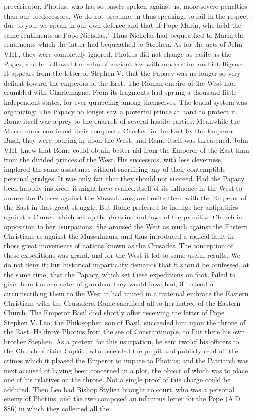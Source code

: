 prevaricator, Photius, who has so basely spoken against us, more severe penalties than our predecessors. We do not presume, in thus speaking, to fail in the respect due to you; we speak in our own defence and that of Pope Marin, who held the same sentiments as Pope Nicholas." Thus Nicholas had bequeathed to Marin the sentiments which the latter had bequeathed to Stephen. As for the acts of John VIII., they were completely ignored. Photius did not change as easily as the Popes, and he followed the rules of ancient law with moderation and intelligence. It appears from the letter of Stephen V. that the Papacy was no longer so very defiant toward the emperors of the East. The Roman empire of the West had crumbled with Charlemagne. From its fragments had sprung a thousand little independent states, for ever quarreling among themselves. The feudal system was organizing: The Papacy no longer saw a powerful prince at hand to protect it. Rome itself was a prey to the quarrels of several hostile parties. Meanwhile the Mussulmans continued their conquests. Checked in the East by the Emperor Basil, they were pouring in upon the West, and Rome itself was threatened. John VIII. knew that Rome could obtain better aid from the Emperor of the East than from the divided princes of the West. His successors, with less cleverness, implored the same assistance without sacrificing any of their contemptible personal grudges. It was only fair that they should not succeed. Had the Papacy been happily inspired, it might have availed itself of its influence in the West to arouse the Princes against the Mussulmans, and unite them with the Emperor of the East in that great struggle. But Rome preferred to indulge her antipathies against a Church which set up the doctrine and laws of the primitive Church in opposition to her usurpations. She aroused the West as much against the Eastern Christians as against the Mussulmans, and thus introduced a radical fault in those great movements of nations known as the Crusades. The conception of these expeditions was grand, and for the West it led to some useful results. We do not deny it; but historical impartiality demands that it should be confessed, at the same time, that the Papacy, which set these expeditions on foot, failed to give them the character of grandeur they would have had, if instead of circumscribing them to the West it had united in a fraternal embrace the Eastern Christians with the Crusaders. Rome sacrificed all to her hatred of the Eastern Church. The Emperor Basil died shortly after receiving the letter of Pope Stephen V. Leo, the Philosopher, son of Basil, succeeded him upon the throne of the East. He drove Photius from the see of Constantinople, to Put there his own brother Stephen. As a pretext for this usurpation, he sent two of his officers to the Church of Saint Sophia, who ascended the pulpit and publicly read off the crimes which it pleased the Emperor to impute to Photius; and the Patriarch was next accused of having been concerned in a plot, the object of which was to place one of his relatives on the throne. Not a single proof of this charge could be adduced. Then Leo had Bishop Stylien brought to court, who was a personal enemy of Photius, and the two composed an infamous letter for the Pope (A.D. 886) in which they collected all the 